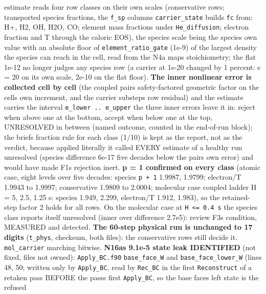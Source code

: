 \documentclass[english,a4paper]{my_memo}
\begin{document}
\begin{itemize}
  estimate reads four row classes on their own scales (conservative rows;
  transported species fractions, the \texttt{f\_sp} columns \texttt{carrier\_state} builds
  \texttt{fc} from: H+, H2, OH, H2O, CO; element mass fractions under
  \texttt{He\_diffusion}; electron fraction and T through the caloric EOS), the
  species scale being the species\textquotesingle{} own value with an absolute floor of
  \texttt{element\_ratio\_gate} (1e-9) of the largest density the species can reach
  in the cell, read from the N4a map\textquotesingle s stoichiometry; the flat 1e-12 no
  longer judges any species row (a carrier at 1e-20 changed by 1 percent:
  e = 20 on its own scale, 2e-10 on the flat floor). \textbf{The inner nonlinear
  error is collected cell by cell} (the coupled pair\textquotesingle s safety-factored
  geometric factor on the cell\textquotesingle s own increment, and the carrier substep\textquotesingle s
  row residual) and the estimate carries the interval \texttt{e\_lower\ ..\ e\_upper}
  the three inner errors leave it in: reject when above one at the bottom,
  accept when below one at the top, UNRESOLVED in between (named outcome,
  counted in the end-of-run block); the brief\textquotesingle s fraction rule for each class
  (1/10) is kept as the report, not as the verdict, because applied
  literally it called EVERY estimate of a healthy run unresolved (species
  difference 6e-17 five decades below the pair\textquotesingle s own error) and would have
  made F1\textquotesingle s rejection inert. \textbf{p = 1 confirmed on every class} (atomic
  case, eight levels over five decades: species \texttt{p\ +\ 1} 1.9987, 1.9799;
  electron/T 1.9943 to 1.9997; conservative 1.9809 to 2.0004; molecular
  case coupled ladder H = 5, 2.5, 1.25 s: species 1.949, 2.299, electron/T
  1.912, 1.983), so the retained-step factor 2 holds for all rows. On the
  molecular case at \texttt{H\ \textless{}=\ 0.4\ s} the species class reports itself
  unresolved (inner over difference 2.7e5): review F3\textquotesingle s condition, MEASURED
  and detected. \textbf{The 60-step physical run is unchanged to 17 digits}
  (\texttt{t\_phys}, checksum, both files): the conservative rows still decide it.
  \texttt{mol\_carrier} marching bitwise. \textbf{N16a\textquotesingle s 9.1e-5 state leak IDENTIFIED}
  (not fixed, files not owned): \texttt{Apply\_BC.f90} \texttt{base\_face\_W} and
  \texttt{base\_face\_lower\_W} (lines 48, 50; written only by \texttt{Apply\_BC}, read by
  \texttt{Rec\_BC} in the first \texttt{Reconstruct} of a retaken pass BEFORE the pass\textquotesingle s
  first \texttt{Apply\_BC}, so the base face\textquotesingle s left state is the refused

\end{itemize}
\end{document}
